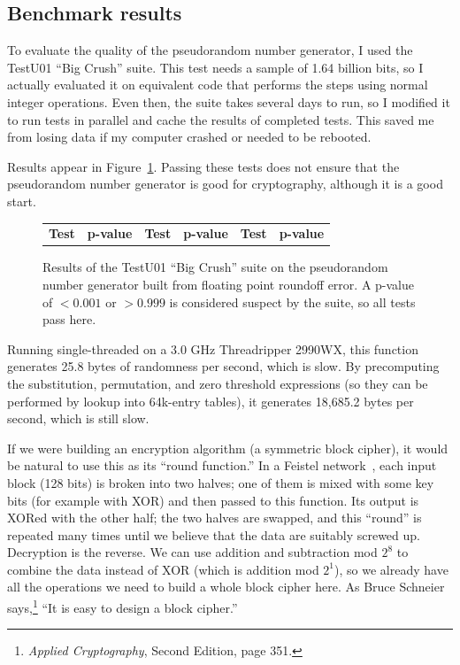 \documentclass[twocolumn]{article}
\begin{document}
\subsection{Benchmark results}
To evaluate the quality of the pseudorandom number generator, I used
the TestU01 ``Big Crush'' suite. This test needs a sample of 1.64
billion bits, so I actually evaluated it on equivalent code that
performs the steps using normal integer operations. Even then, the
suite takes several days to run, so I modified it to run tests in
parallel and cache the results of completed tests. This saved me from
losing data if my computer crashed or needed to be rebooted.

Results appear in Figure~\ref{fig:testu01}. Passing these tests does
not ensure that the pseudorandom number generator is good for
cryptography, although it is a good start.

\begin{figure}[tp]
  \footnotesize
  \begin{tabular}{rl|rl|rl}
    {\bf Test} & {\bf p-value} &
    {\bf Test} & {\bf p-value} &
    {\bf Test} & {\bf p-value} \\
    
  \end{tabular}
  \caption{
    Results of the TestU01 ``Big Crush'' suite on the
    pseudorandom number generator built from floating point roundoff
    error. A p-value of $< 0.001$ or $> 0.999$ is considered
    suspect by the suite, so all tests pass here.
  } \label{fig:testu01}
\end{figure}

Running single-threaded on a 3.0 GHz Threadripper 2990WX, this
function generates 25.8 bytes of randomness per second, which is slow.
By precomputing the substitution, permutation, and zero threshold
expressions (so they can be performed by lookup into 64k-entry tables),
it generates 18,685.2 bytes per second, which is still slow.

If we were building an encryption algorithm (a symmetric block
cipher), it would be natural to use this as its ``round function.'' In
a Feistel network~\cite{feistel1973cryptography}, each input block
(128 bits) is broken into two halves; one of them is mixed with some
key bits (for example with XOR) and then passed to this function. Its
output is XORed with the other half; the two halves are swapped, and
this ``round'' is repeated many times until we believe that the data
are suitably screwed up. Decryption is the reverse. We can use
addition and subtraction mod $2^8$ to combine the data instead of XOR
(which is addition mod $2^1$), so we already have all the operations
we need to build a whole block cipher here. As Bruce Schneier
says,\footnote{{\it Applied Cryptography}, Second Edition, page 351.}
``It is easy to design a block cipher.''
\end{document}
